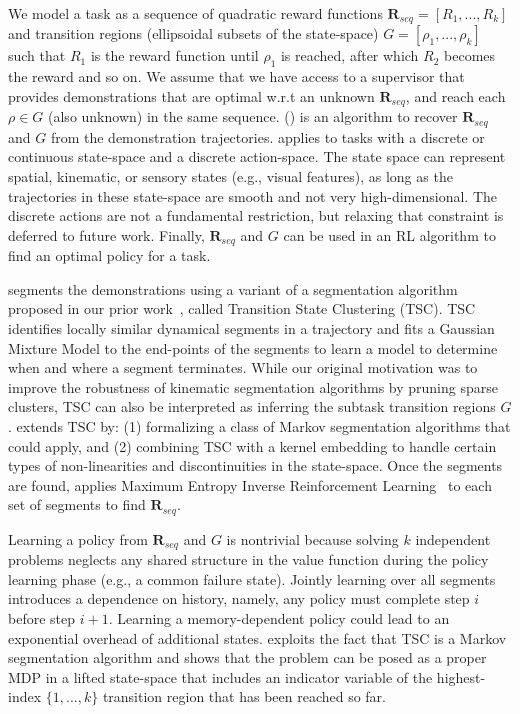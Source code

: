 We model a task as a sequence of quadratic reward functions $\mathbf{R}_{seq}=[R_1,...,R_k]$ and transition regions (ellipsoidal subsets of the state-space) $G = [\rho_1, ...,\rho_k]$ such that $R_1$ is the reward function until $\rho_1$ is reached, after which $R_2$ becomes the reward and so on.
We assume that we have access to a supervisor that provides demonstrations that are optimal w.r.t an unknown $\mathbf{R}_{seq}$, and reach each $\rho \in G$ (also unknown) in the same sequence. 
\hirlfull (\hirl) is an algorithm to recover $\mathbf{R}_{seq}$ and $G$ from the demonstration trajectories.
\hirl applies to tasks with a discrete or continuous state-space and a discrete action-space.
The state space can represent spatial, kinematic, or sensory states (e.g., visual features), as long as the trajectories in these state-space are smooth and not very high-dimensional.
The discrete actions are not a fundamental restriction, but relaxing that constraint is deferred to future work.
Finally, $\mathbf{R}_{seq}$ and $G$ can be used in an RL algorithm to find an optimal policy for a task.

\hirl segments the demonstrations using a variant of a segmentation algorithm proposed in our prior work~\citep{krishnan2015tsc,murali2016}, called Transition State Clustering (TSC).
TSC identifies locally similar dynamical segments in a trajectory and fits a Gaussian Mixture Model to the end-points of the segments to learn a model to determine when and where a segment terminates.
While our original motivation was to improve the robustness of kinematic segmentation algorithms by pruning sparse clusters, TSC can also be interpreted as inferring the subtask transition regions $G$.
\hirl extends TSC by: (1) formalizing a class of Markov segmentation algorithms that could apply, and (2) combining TSC with a kernel embedding to handle certain types of non-linearities and discontinuities in the state-space.
Once the segments are found, \hirl applies Maximum Entropy Inverse Reinforcement Learning~\citep{DBLP:conf/aaai/ZiebartMBD08} to each set of segments to find $\mathbf{R}_{seq}$.

Learning a policy from $\mathbf{R}_{seq}$ and $G$ is nontrivial because solving $k$ independent problems neglects any shared structure in the value function during the policy learning phase (e.g., a common failure state).
Jointly learning over all segments introduces a dependence on history, namely, any policy must complete step $i$ before step $i+1$.
Learning a memory-dependent policy could lead to an exponential overhead of additional states. 
\hirl exploits the fact that TSC is a Markov segmentation algorithm and shows that the problem can be posed as a proper MDP in a lifted state-space that includes an indicator variable of the highest-index $\{1,...,k\}$ transition region that has been reached so far.

